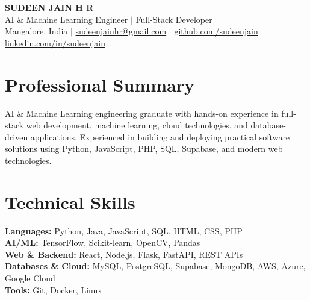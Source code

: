 \documentclass[10pt,letterpaper]{article}
\begin{document}
\begin{center}
  {\LARGE\bfseries SUDEEN JAIN H R}\\[2pt]
  {\normalsize AI \& Machine Learning Engineer $|$ Full-Stack Developer}\\[4pt]
  \small
  Mangalore, India $|$
  \href{mailto:sudeenjainhr@gmail.com}{sudeenjainhr@gmail.com} $|$
  \href{https://github.com/sudeenjain}{github.com/sudeenjain} $|$
  \href{https://linkedin.com/in/sudeenjain}{linkedin.com/in/sudeenjain}
\end{center}

\section{Professional Summary}
AI \& Machine Learning engineering graduate with hands-on experience in full-stack web development, machine learning, cloud technologies, and database-driven applications. Experienced in building and deploying practical software solutions using Python, JavaScript, PHP, SQL, Supabase, and modern web technologies.

\section{Technical Skills}
\textbf{Languages:} Python, Java, JavaScript, SQL, HTML, CSS, PHP\\
\textbf{AI/ML:} TensorFlow, Scikit-learn, OpenCV, Pandas\\
\textbf{Web \& Backend:} React, Node.js, Flask, FastAPI, REST APIs\\
\textbf{Databases \& Cloud:} MySQL, PostgreSQL, Supabase, MongoDB, AWS, Azure, Google Cloud\\
\textbf{Tools:} Git, Docker, Linux
\end{document}
